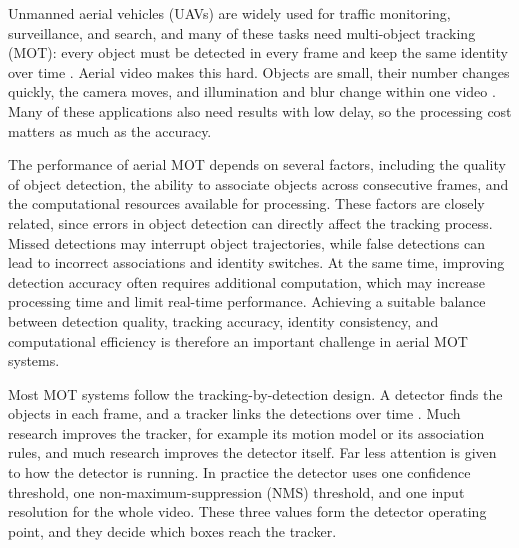 \documentclass[pdflatex,sn-mathphys-num,iicol]{sn-jnl}
\makeatletter
\def\sectionfont{\reset@font\fontfamily{\rmdefault}\fontsize{11bp}{13bp}\bfseries\selectfont\raggedright\boldmath}
\renewcommand\section{\@startsection{section}{1}{\z@}{-8pt \@plus -2pt \@minus -2pt}{4pt}{\sectionfont}}
\makeatother
\begin{document}
\maketitle

\section{Introduction}\label{sec:intro}

Unmanned aerial vehicles (UAVs) are widely used for traffic monitoring,
surveillance, and search, and many of these tasks need multi-object tracking
(MOT): every object must be detected in every frame and keep the same
identity over time \cite{wu2022uavsurvey,zhu2022visdrone}. Aerial video makes
this hard. Objects are small, their number changes quickly, the camera moves,
and illumination and blur change within one video
\cite{zhu2022visdrone,du2018uavdt,cheng2023smallobject}. Many of these
applications also need results with low delay, so the processing cost matters
as much as the accuracy.

The performance of aerial MOT depends on several factors, including the quality of object detection, the ability to associate objects across consecutive frames, and the computational resources available for processing. These factors are closely related, since errors in object detection can directly affect the tracking process. Missed detections may interrupt object trajectories, while false detections can lead to incorrect associations and identity switches. At the same time, improving detection accuracy often requires additional computation, which may increase processing time and limit real-time performance. Achieving a suitable balance between detection quality, tracking accuracy, identity consistency, and computational efficiency is therefore an important challenge in aerial MOT systems.

Most MOT systems follow the tracking-by-detection design. A detector finds the
objects in each frame, and a tracker links the detections over time
\cite{bewley2016sort,zhang2022bytetrack}. Much research improves the tracker,
for example its motion model or its association rules, and much research
improves the detector itself. Far less attention is given to how the detector
is running. In practice the detector uses one confidence threshold, one
non-maximum-suppression (NMS) threshold, and one input resolution for the
whole video. These three values form the detector operating point, and they
decide which boxes reach the tracker.
\end{document}
